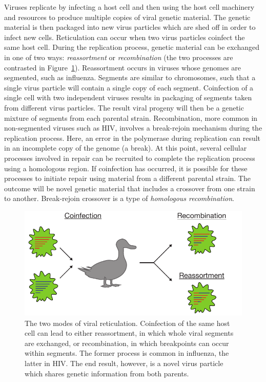 Viruses replicate by infecting a host cell and then using the host cell machinery and resources to produce multiple copies of viral genetic material.
The genetic material is then packaged into new virus particles which are shed off in order to infect new cells.
Reticulation can occur when two virus particles coinfect the same host cell.
During the replication process, genetic material can be exchanged in one of two ways: \emph{reassortment} or \emph{recombination} (the two processes are contrasted in Figure~\ref{fig:viral_reticulation}).
Reassortment occurs in viruses whose genomes are segmented, such as influenza.
Segments are similar to chromosomes, such that a single virus particle will contain a single copy of each segment.
Coinfection of a single cell with two independent viruses results in packaging of segments taken from different virus particles.
The result viral progeny will then be a genetic mixture of segments from each parental strain.
Recombination, more common in non-segmented viruses such as HIV, involves a break-rejoin mechanism during the replication process.
Here, an error in the polymerase during replication can result in an incomplete copy of the genome (a break).
At this point, several cellular processes involved in repair can be recruited to complete the replication process using a homologous region.
If coinfection has occurred, it is possible for these processes to initiate repair using material from a different parental strain.
The outcome will be novel genetic material that includes a crossover from one strain to another.
Break-rejoin crossover is a type of \emph{homologous recombination}.

\begin{figure}
\centering
\includegraphics[]{./fig/background/viral_reticulation.pdf}
\caption[Viral recombination and reassortment]{The two modes of viral reticulation. Coinfection of the same host cell can lead to either reassortment, in which whole viral segments are exchanged, or recombination, in which breakpoints can occur within segments. The former process is common in influenza, the latter in HIV. The end result, however, is a novel virus particle which shares genetic information from both parents.}
\label{fig:viral_reticulation}
\end{figure}

